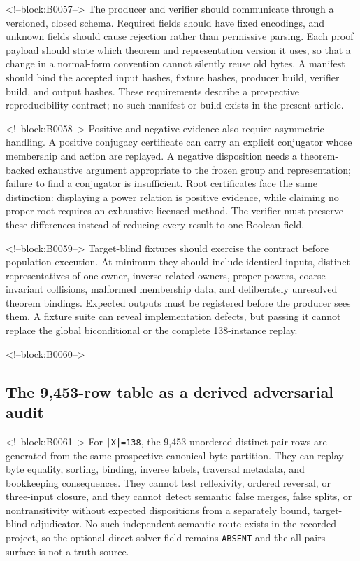 \documentclass[11pt]{article}
\begin{document}
<!--block:B0057-->
The producer and verifier should communicate through a versioned,
closed schema. Required fields should have fixed encodings, and unknown
fields should cause rejection rather than permissive parsing. Each proof
payload should state which theorem and representation version it uses,
so that a change in a normal-form convention cannot silently reuse old
bytes. A manifest should bind the accepted input hashes, fixture hashes,
producer build, verifier build, and output hashes. These requirements
describe a prospective reproducibility contract; no such manifest or
build exists in the present article.

<!--block:B0058-->
Positive and negative evidence also require asymmetric handling. A
positive conjugacy certificate can carry an explicit conjugator whose
membership and action are replayed. A negative disposition needs a
theorem-backed exhaustive argument appropriate to the frozen group and
representation; failure to find a conjugator is insufficient. Root
certificates face the same distinction: displaying a power relation is
positive evidence, while claiming no proper root requires an exhaustive
licensed method. The verifier must preserve these differences instead
of reducing every result to one Boolean field.

<!--block:B0059-->
Target-blind fixtures should exercise the contract before population
execution. At minimum they should include identical inputs, distinct
representatives of one owner, inverse-related owners, proper powers,
coarse-invariant collisions, malformed membership data, and deliberately
unresolved theorem bindings. Expected outputs must be registered before
the producer sees them. A fixture suite can reveal implementation
defects, but passing it cannot replace the global biconditional or the
complete 138-instance replay.

<!--block:B0060-->
\hypertarget{43-the-9453-row-table-as-a-derived-adversarial-audit}{%
\subsection{The 9,453-row table as a derived adversarial
audit}\label{43-the-9453-row-table-as-a-derived-adversarial-audit}}

<!--block:B0061-->
For \texttt{|X|=138}, the 9,453 unordered distinct-pair rows are generated from
the same prospective canonical-byte partition.  They can replay byte equality,
sorting, binding, inverse labels, traversal metadata, and bookkeeping
consequences.  They cannot test reflexivity, ordered reversal, or three-input
closure, and they cannot detect semantic false merges, false splits, or
nontransitivity without expected dispositions from a separately bound,
target-blind adjudicator.  No such independent semantic route exists in the
recorded project, so the optional direct-solver field remains \texttt{ABSENT}
and the all-pairs surface is not a truth source.
\end{document}
